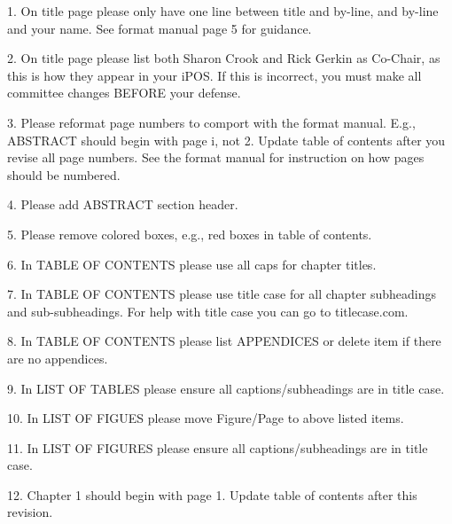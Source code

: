 
 


1. On title page please only have one line between title and by-line, and by-line and your name. See format manual page 5 for guidance. 

2. On title page please list both Sharon Crook and Rick Gerkin as Co-Chair, as this is how they appear in your iPOS. If this is incorrect, you must make all committee changes BEFORE your defense. 

3. Please reformat page numbers to comport with the format manual. E.g., ABSTRACT should begin with page i, not 2. Update table of contents after you revise all page numbers. See the format manual for instruction on how pages should be numbered. 

4. Please add ABSTRACT section header. 

5. Please remove colored boxes, e.g., red boxes in table of contents. 

6. In TABLE OF CONTENTS please use all caps for chapter titles. 

7. In TABLE OF CONTENTS please use title case for all chapter subheadings and sub-subheadings. For help with title case you can go to titlecase.com. 

8. In TABLE OF CONTENTS please list APPENDICES or delete item if there are no appendices. 

9. In LIST OF TABLES please ensure all captions/subheadings are in title case. 

10. In LIST OF FIGUES please move Figure/Page to above listed items. 

11. In LIST OF FIGURES please ensure all captions/subheadings are in title case. 

12. Chapter 1 should begin with page 1. Update table of contents after this revision. 



